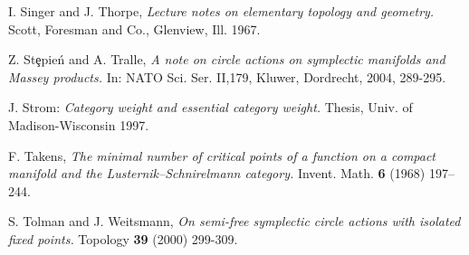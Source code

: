 \documentclass[12pt]{amsart}
\numberwithin{equation}{section}
\theoremstyle{definition}
\theoremstyle{remark}
\numberwithin{figure}{section}
\numberwithin{table}{section}
\begin{document}
\begin{thebibliography}{ABCDE}
 
I. Singer and J. Thorpe, 
{\em Lecture notes on elementary topology and geometry.} 
Scott, Foresman and Co., Glenview, Ill. 1967. 
 
Z. St\c epie\'n and A. Tralle, {\em A note on circle actions on symplectic  
manifolds and Massey products.} In: NATO Sci. Ser. II,179, Kluwer, Dordrecht, 
2004, 289-295. 
 
J. Strom: {\em Category weight and essential 
category weight.} Thesis, Univ. of Madison-Wisconsin 1997. 
 
F. Takens, {\em The minimal number of critical points of a function on a  
compact manifold and the Lusternik--Schnirelmann category.} Invent. Math. {\bf  
6} (1968) 197--244. 
  
S. Tolman and J. Weitsmann, {\em On semi-free symplectic circle actions with  
isolated fixed points.} Topology {\bf 39}  (2000) 299-309. 
 
 
 
\end{thebibliography} 
\end{document}
